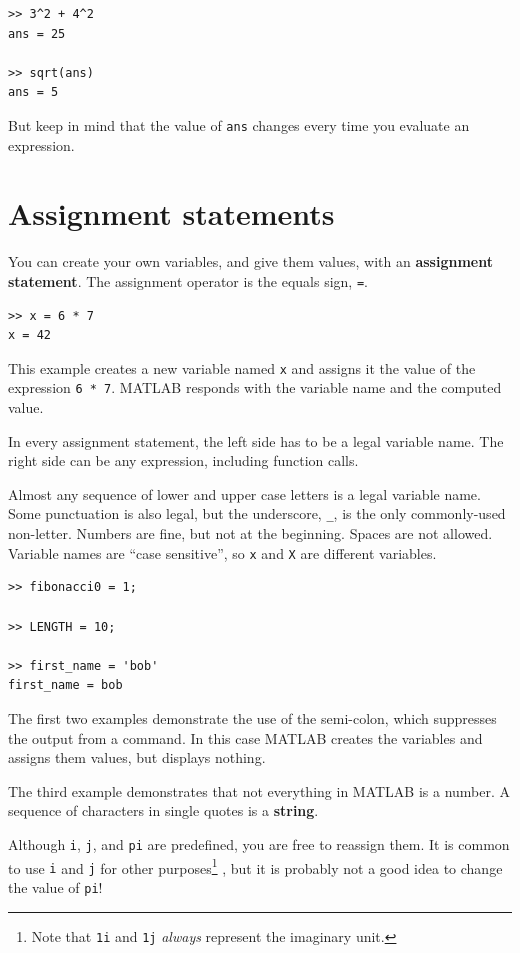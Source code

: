 \documentclass[
]{book}
\begin{document}
\begin{verbatim}
>> 3^2 + 4^2
ans = 25

>> sqrt(ans)
ans = 5
\end{verbatim}

But keep in mind that the value of {\tt ans} changes every time
you evaluate an expression.


\section{Assignment statements}

You can create your own variables, and give them values, with
an {\bf assignment statement}.  The assignment operator is the
equals sign, {\tt =}.

\begin{verbatim}
>> x = 6 * 7
x = 42
\end{verbatim}

This example creates a new variable named {\tt x} and assigns it the
value of the expression {\tt 6 * 7}.  MATLAB responds with the
variable name and the computed value.

In every assignment statement, the left side has to be a
legal variable name.  The right side can be any expression,
including function calls.

Almost any sequence of lower and upper case letters is a legal
variable name.  Some punctuation is also legal, but the underscore,
{\tt \_}, is the only commonly-used non-letter.  Numbers are fine, but
not at the beginning.  Spaces are not allowed.  Variable names are
``case sensitive'', so {\tt x} and {\tt X} are different variables.

\begin{verbatim}
>> fibonacci0 = 1;

>> LENGTH = 10;

>> first_name = 'bob'
first_name = bob
\end{verbatim}

The first two examples demonstrate the use of the semi-colon, which
suppresses the output from a command.  In this case MATLAB creates the
variables and assigns them values, but displays nothing.

The third example demonstrates that not everything
in MATLAB is a number.  A sequence of characters in single quotes is
a {\bf string}.

Although {\tt i}, {\tt j}, and {\tt pi} are predefined, you are free
to reassign them.  It is common to use {\tt i} and {\tt j} for other
purposes\footnote{Note that {\tt 1i} and {\tt 1j} \textit{always}
represent the imaginary unit.}
, but it is probably not a good idea to change the value of
{\tt pi}!
\end{document}
